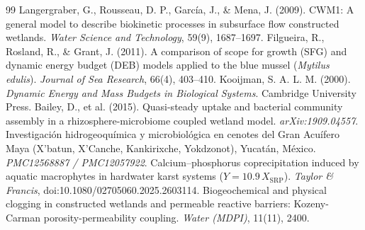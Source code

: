 \documentclass[11pt,letterpaper]{article}
\begin{document}
\begin{thebibliography}{99}
\small
{} Langergraber, G., Rousseau, D. P., García, J., \& Mena, J. (2009). CWM1: A general model to describe biokinetic processes in subsurface flow constructed wetlands. \textit{Water Science and Technology}, 59(9), 1687--1697.
 Filgueira, R., Rosland, R., \& Grant, J. (2011). A comparison of scope for growth (SFG) and dynamic energy budget (DEB) models applied to the blue mussel (\textit{Mytilus edulis}). \textit{Journal of Sea Research}, 66(4), 403--410.
 Kooijman, S. A. L. M. (2000). \textit{Dynamic Energy and Mass Budgets in Biological Systems}. Cambridge University Press.
 Bailey, D., et al. (2015). Quasi-steady uptake and bacterial community assembly in a rhizosphere-microbiome coupled wetland model. \textit{arXiv:1909.04557}.
 Investigación hidrogeoquímica y microbiológica en cenotes del Gran Acuífero Maya (X'batun, X'Canche, Kankirixche, Yokdzonot), Yucatán, México. \textit{PMC12568887 / PMC12057922}.
 Calcium--phosphorus coprecipitation induced by aquatic macrophytes in hardwater karst systems ($Y = 10.9\,X_{\text{SRP}}$). \textit{Taylor \& Francis}, doi:10.1080/02705060.2025.2603114.
 Biogeochemical and physical clogging in constructed wetlands and permeable reactive barriers: Kozeny-Carman porosity-permeability coupling. \textit{Water (MDPI)}, 11(11), 2400.
\end{thebibliography}
\end{document}
